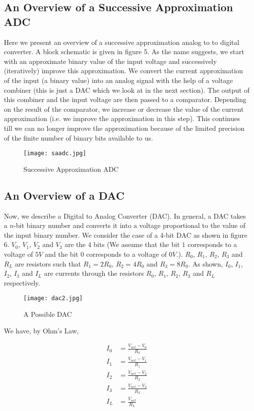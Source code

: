 \subsection{An Overview of a Successive Approximation ADC}
Here we present an overview of a successive approximation analog to to digital converter. A block schematic is given in figure 5. As the name suggests, we start with an approximate binary value of the input voltage and successively (iteratively) improve this approximation. We convert the current approximation of the input (a binary value) into an analog signal with the help of a voltage combiner (this is just a DAC which we look at in the next section). The output of this combiner and the input voltage are then passed to a comparator. Depending on the result of the comparator, we increase or decrease the value of the current approximation (i.e. we improve the approximation in this step). This continues till we can no longer improve the approximation because of the limited precision of the finite number of binary bits available to us.
\begin{figure}[H]
 	\texttt{[image: saadc.jpg]}
    \caption{Successive Approximation ADC}
\end{figure}
\subsection{An Overview of a DAC}
Now, we describe a Digital to Analog Converter (DAC). In general, a DAC takes a $n$-bit binary number and converts it into a voltage proportional to the value of the input binary number. We consider the case of a 4-bit DAC as shown in figure 6. $V_{0}$, $V_{1}$, $V_{2}$ and $V_{3}$ are the 4 bits (We assume that the bit $1$ corresponds to a voltage of $5V$ and the bit $0$ corresponds to a voltage of $0V$.). $R_{0}$, $R_{1}$, $R_{2}$, $R_{3}$ and $R_{L}$ are resistors such that $R_{1} = 2R_{0}$, $R_{2} = 4R_{0}$ and $R_{3} = 8R_{0}$. As shown, $I_{0}$, $I_{1}$, $I_{2}$, $I_{3}$ and $I_{L}$ are currents through the resistors $R_{0}$, $R_{1}$, $R_{2}$, $R_{3}$ and $R_{L}$ respectively.
\begin{figure}
 	\texttt{[image: dac2.jpg]}
    \caption{A Possible DAC}
\end{figure}




We have, by Ohm's Law,


\begin{align*}
I_{0} &= \frac{V_{net} - V_{0}}{R_{0}}\\
I_{1} &= \frac{V_{net} - V_{1}}{R_{1}}\\
I_{2} &= \frac{V_{net} - V_{2}}{R_{2}}\\
I_{3} &= \frac{V_{net} - V_{3}}{R_{3}}\\
I_{L} &= \frac{V_{net}}{R_{L}}
\end{align*}



